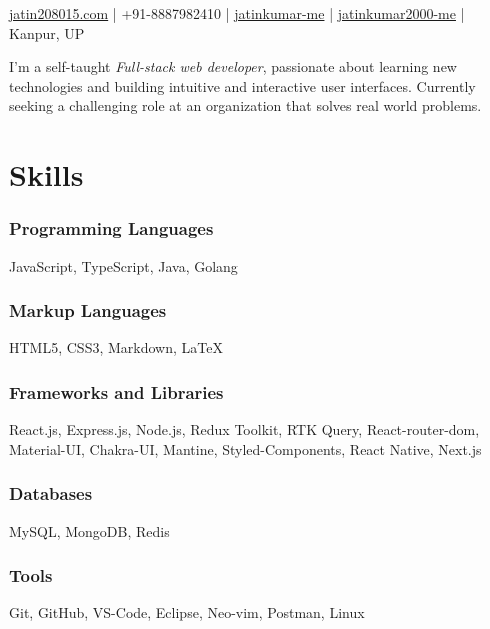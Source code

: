 \documentclass[a4paper]{article}
\author{Jatin Kumar}
\begin{document}
\begin{center}
	\makeatletter
	\centering {\huge \@author}
	\makeatother
    \vspace{6pt}

    \href{mailto:jatin208015\@gmail.com}{{\faAt} jatin208015\@gmail.com} | {\faPhone } +91-8887982410 | \href{https://github.com/jatinkumar-me}{{\faGithub} jatinkumar-me} | \href{https://www.linkedin.com/in/jatinkumar-2000-me/}{{\faLinkedin} {jatinkumar2000-me}} | {\faMapMarker} Kanpur, UP
\end{center}

\begin{flushleft}
    I’m a self-taught \textit{Full-stack web developer}, passionate about learning new technologies and building intuitive and interactive user interfaces. Currently seeking a challenging role at an organization that solves real world problems.
\end{flushleft}

\section{Skills}
\subsubsection*{Programming Languages}
    JavaScript, TypeScript, Java, Golang
    \vspace{-10pt}
\subsubsection*{Markup Languages}
    HTML5, CSS3, Markdown, \LaTeX
    \vspace{-10pt}
\subsubsection*{Frameworks and Libraries}
React.js, Express.js, Node.js, Redux Toolkit, RTK Query, React-router-dom, Material-UI, Chakra-UI, Mantine, Styled-Components, React Native, Next.js
    \vspace{-10pt}
\subsubsection*{Databases}
MySQL, MongoDB, Redis
    \vspace{-10pt}
\subsubsection*{Tools}
Git, GitHub, VS-Code, Eclipse, Neo-vim, Postman, Linux
\end{document}
